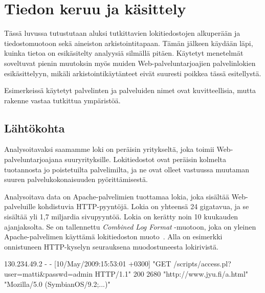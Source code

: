 
\chapter{Tiedon keruu ja käsittely}

Tässä luvussa tutustutaan aluksi tutkittavien lokitiedostojen
alkuperään ja tiedostomuotoon sekä aineiston arkistointitapaan. Tämän
jälkeen käydään läpi, kuinka tietoa on esikäsitelty analyysiä silmällä
pitäen. Käytetyt menetelmät soveltuvat pienin muutoksin myös muiden
Web-palveluntarjoajien palvelinlokien esikäsittelyyn, mikäli
arkistointikäytänteet eivät suuresti poikkea tässä esitellystä.

Esimerkeissä käytetyt palvelinten ja palveluiden nimet ovat
kuvitteellisia, mutta rakenne vastaa tutkittua ympäristöä.


\section{Lähtökohta}
\label{sec:lahtokohta}

Analysoitavaksi saamamme loki on peräisin yritykseltä, joka toimii
Web-\-palveluntarjoajana suuryrityksille. Lokitiedostot ovat peräisin
kolmelta tuotannosta jo poistetuilta palvelimilta, ja ne ovat olleet
vastuussa muutaman suuren palvelukokonaisuuden pyörittämisestä.

Analysoitava data on Apache-palvelimien tuottamaa lokia, joka sisältää
Web-palveluille kohdistuvia HTTP-pyyntöjä. Lokia on yhteensä 24
gigatavua, ja se sisältää yli 1,7 miljardia sivupyyntöä.
Lokia on kerätty noin 10 kuukauden
ajanjaksolta. Se on tallennettu \textit{Combined Log Format} -muotoon,
joka on yleinen Apache-palvelimen käyttämä lokitiedoston
muoto~\cite{combined}. Alla on esimerkki onnistuneen HTTP-kyselyn seurauksena muodostuneesta lokirivistä.


\begin{framed}
\begin{verbatim*}
130.234.49.2 - - [10/May/2009:15:53:01 +0300]
"GET /scripts/access.pl?user=matti&passwd=admin HTTP/1.1"
200 2680 "http://www.jyu.fi/a.html"
"Mozilla/5.0 (SymbianOS/9.2;...)"
\end{verbatim*}
\end{framed}

